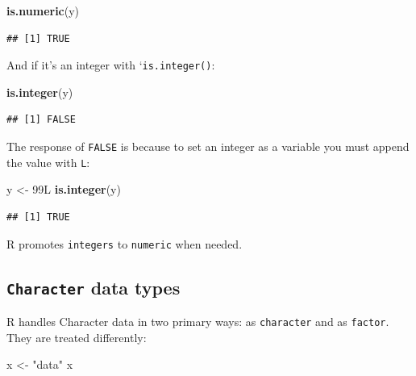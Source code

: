 \documentclass[]{book}
\newenvironment{Shaded}{\begin{snugshade}}{\end{snugshade}}
\newcommand{\KeywordTok}[1]{\textcolor[rgb]{0.13,0.29,0.53}{\textbf{#1}}}
\newcommand{\NormalTok}[1]{#1}
\newcommand{\StringTok}[1]{\textcolor[rgb]{0.31,0.60,0.02}{#1}}
\theoremstyle{definition}
\theoremstyle{definition}
\theoremstyle{definition}
\theoremstyle{remark}
\begin{document}
\begin{Shaded}
\begin{Highlighting}[]
\KeywordTok{is.numeric}\NormalTok{(y)}
\end{Highlighting}
\end{Shaded}

\begin{verbatim}
## [1] TRUE
\end{verbatim}

And if it's an integer with `\texttt{is.integer()}:

\begin{Shaded}
\begin{Highlighting}[]
\KeywordTok{is.integer}\NormalTok{(y)}
\end{Highlighting}
\end{Shaded}

\begin{verbatim}
## [1] FALSE
\end{verbatim}

The response of \texttt{FALSE} is because to set an integer as a
variable you must append the value with \texttt{L}:

\begin{Shaded}
\begin{Highlighting}[]
\NormalTok{y <-}\StringTok{ }\NormalTok{99L}
\KeywordTok{is.integer}\NormalTok{(y)}
\end{Highlighting}
\end{Shaded}

\begin{verbatim}
## [1] TRUE
\end{verbatim}

R promotes \texttt{integers} to \texttt{numeric} when needed.

\hypertarget{character-data-types}{%
\subsection{\texorpdfstring{\texttt{Character} data
types}{Character data types}}\label{character-data-types}}

R handles Character data in two primary ways: as \texttt{character} and
as \texttt{factor}. They are treated differently:

\begin{Shaded}
\begin{Highlighting}[]
\NormalTok{x <-}\StringTok{ "data"}
\NormalTok{x}
\end{Highlighting}
\end{Shaded}
\end{document}

